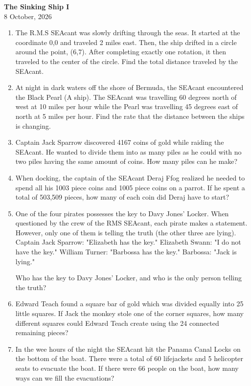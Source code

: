 \documentclass[inline]{article}
\begin{document}
\begin{center}
{\Large\bfseries The Sinking Ship I}\\[0.25cm]
{\large 8 October, 2026}\\[1cm]
\end{center}

\begin{enumerate}[itemsep=2.85cm]
    \section{Problems}
    \item The R.M.S SEAcant was slowly drifting through the seas. It started at the coordinate 0,0 and traveled 2 miles east. Then, the ship drifted in a circle around the point, (6,7). After completing exactly one rotation, it then traveled to the center of the circle. Find the total distance traveled by the SEAcant.
    \item At night in dark waters off the shore of Bermuda, the SEAcant encountered the Black Pearl (A ship). The SEAcant was travelling 60 degrees north of west at 10 miles per hour while the Pearl was travelling 45 degrees east of north at 5 miles per hour. Find the rate that the distance between the ships is changing.
    \item Captain Jack Sparrow discovered 4167 coins of gold while raiding the SEAcant. He wanted to divide them into as many piles as he could with no two piles having the same amount of coins. How many piles can he make?
    \item When docking, the captain of the SEAcant Deraj Ffog realized he needed to spend all his 1003 piece coins and 1005 piece coins on a parrot. If he spent a total of 503,509 pieces, how many of each coin did Deraj have to start?

    \item One of the four pirates possesses the key to Davy Jones' Locker. When questioned by the crew of the RMS SEAcant, each pirate makes a statement. However, only one of them is telling the truth (the other three are lying).
    Captain Jack Sparrow: "Elizabeth has the key."
    Elizabeth Swann: "I do not have the key."
    William Turner: "Barbossa has the key."
    Barbossa: "Jack is lying."
    
    Who has the key to Davy Jones' Locker, and who is the only person telling the truth?
    \item Edward Teach found a square bar of gold which was divided equally into 25 little squares. If Jack the monkey stole one of the corner squares, how many different squares could Edward Teach create using the 24 connected remaining pieces?

    \item In the wee hours of the night the SEAcant hit the Panama Canal Locks on the bottom of the boat. There were a total of 60 lifejackets and 5 helicopter seats to evacuate the boat. If there were 66 people on the boat, how many ways can we fill the evacuations?
    
\end{enumerate}
\end{document}
